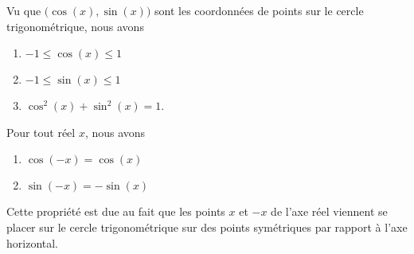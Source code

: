 \begin{center}
   
\end{center}

\begin{propriete}
    Vu que \( \big( \cos(x),\sin(x) \big)\) sont les coordonnées de points sur le cercle trigonométrique, nous avons
    \begin{enumerate}
        \item
            \( -1\leq \cos(x)\leq 1\)
        \item
            \( -1\leq \sin(x)\leq 1\)
        \item
            \( \cos^2(x)+\sin^2(x)=1\).
    \end{enumerate}
\end{propriete}

\begin{propriete}
    Pour tout réel \( x\), nous avons
    \begin{enumerate}
        \item
            \( \cos(-x)=\cos(x)\)
        \item
        \( \sin(-x)=-\sin(x)\)
    \end{enumerate}
\end{propriete}
Cette propriété est due au fait que les points \( x\) et \( -x\) de l'axe réel viennent se placer sur le cercle trigonométrique sur des points symétriques par rapport à l'axe horizontal.
